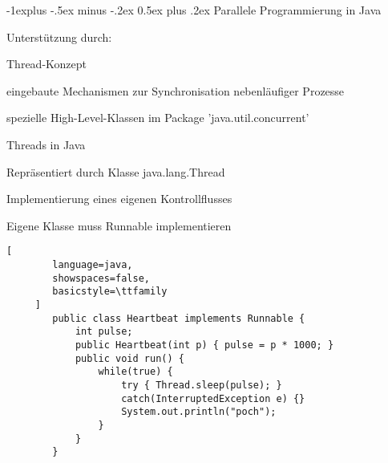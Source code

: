 \documentclass[10pt]{article}
\makeatletter
\renewcommand{\subsection}{\@startsection{subsection}{2}{0mm}%
                                {-1explus -.5ex minus -.2ex}%
                                {0.5ex plus .2ex}%
                                {\normalfont\normalsize\bfseries}}
\makeatother
\begin{document}
\begin{itemize*}
\subsection{Parallele Programmierung in Java}
\begin{itemize*}
  \item Unterstützung durch:
  \begin{itemize*}
    \item Thread-Konzept
    \item eingebaute Mechanismen zur Synchronisation nebenläufiger Prozesse
    \item spezielle High-Level-Klassen im Package 'java.util.concurrent'
  \end{itemize*}
  \item Threads in Java
  \begin{itemize*}
    \item Repräsentiert durch Klasse java.lang.Thread
    \item Implementierung eines eigenen Kontrollflusses
    \item Eigene Klasse muss Runnable implementieren
  \end{itemize*}
  \begin{lstlisting}[
        language=java,
        showspaces=false,
        basicstyle=\ttfamily
     ]
        public class Heartbeat implements Runnable {
            int pulse;
            public Heartbeat(int p) { pulse = p * 1000; }
            public void run() {
                while(true) {
                    try { Thread.sleep(pulse); }
                    catch(InterruptedException e) {}
                    System.out.println("poch");
                }
            }
        }


\end{lstlisting}
\end{itemize*}
\end{itemize*}
\end{document}
